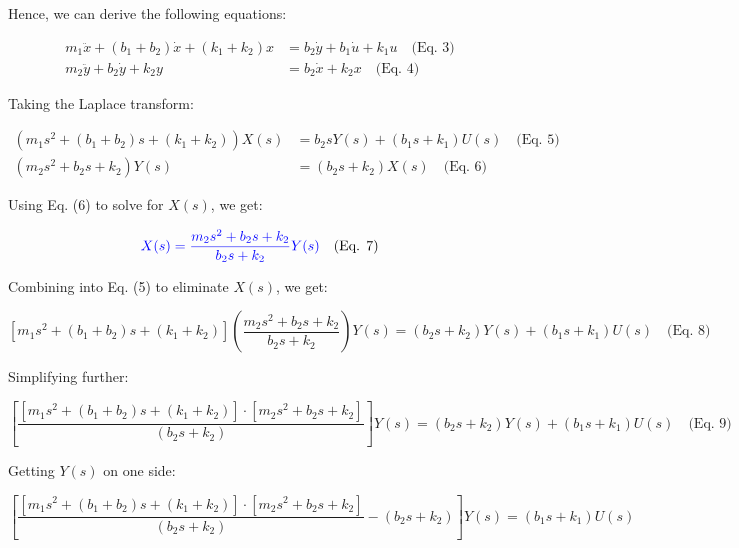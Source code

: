 \documentclass[12pt]{article}
\begin{document}
Hence, we can derive the following equations:

\begin{equation*}
	\begin{aligned}
		m_1 \ddot{x} + (b_1 + b_2) \dot{x} + (k_1 + k_2) x & = b_2 \dot{y} + b_1 \dot{u} + k_1 u \quad \text{(Eq. 3)} \\
		m_2 \ddot{y} + b_2 \dot{y} + k_2 y                 & = b_2 \dot{x} + k_2 x \quad \text{(Eq. 4)}               
	\end{aligned}
\end{equation*}

Taking the Laplace transform:

\begin{equation*}
	\begin{aligned}
		(m_1 s^2 + (b_1 + b_2)s + (k_1 + k_2))X(s) & = b_2 s Y(s) + (b_1 s + k_1) U(s) \quad \text{(Eq. 5)} \\
		(m_2 s^2 + b_2 s + k_2)Y(s)                & = (b_2 s + k_2) X(s) \quad \text{(Eq. 6)}              
	\end{aligned}
\end{equation*}

Using Eq. (6) to solve for \( X(s) \), we get:

\begin{equation*}
	\textcolor{blue}{X(s) = \frac{m_2 s^2 + b_2 s + k_2}{b_2 s + k_2}Y(s)} \quad \text{(Eq. 7)}
\end{equation*}

Combining into Eq. (5) to eliminate \( X(s) \), we get:

\begin{equation*}
	\left[ m_1 s^2 + (b_1 + b_2) s + (k_1 + k_2) \right] \left( \frac{m_2 s^2 + b_2 s + k_2}{b_2 s + k_2} \right) Y(s)  = (b_2 s + k_2) Y(s) + (b_1 s + k_1) U(s) \quad \text{(Eq. 8)}
\end{equation*}

Simplifying further:

\begin{equation*}
	\left[ \frac{[m_1 s^2 + (b_1 + b_2) s + (k_1 + k_2)]\cdot [m_2 s^2 + b_2 s + k_2]}{(b_2 s + k_2)} \right] Y(s) = (b_2 s + k_2) Y(s) + (b_1 s + k_1) U(s) \quad \text{(Eq. 9)}
\end{equation*}

Getting \( Y(s) \) on one side:

\begin{equation*}
	\left[ \frac{[m_1 s^2 + (b_1 + b_2) s + (k_1 + k_2)]\cdot [m_2 s^2 + b_2 s + k_2]}{(b_2 s + k_2)} - (b_2 s + k_2) \right] Y(s) = (b_1 s + k_1) U(s)
\end{equation*}
\end{document}

